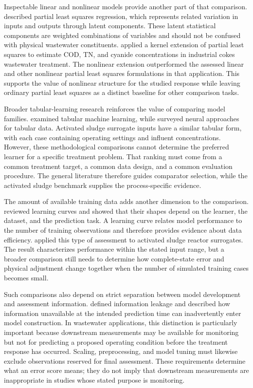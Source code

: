 Inspectable linear and nonlinear models provide another part of that comparison. \citet{Wold2001} described partial least squares regression, which represents related variation in inputs and outputs through latent components. These latent statistical components are weighted combinations of variables and should not be confused with physical wastewater constituents. \citet{Woo2009} applied a kernel extension of partial least squares to estimate COD, TN, and cyanide concentrations in industrial cokes wastewater treatment. The nonlinear extension outperformed the assessed linear and other nonlinear partial least squares formulations in that application. This supports the value of nonlinear structure for the studied response while leaving ordinary partial least squares as a distinct baseline for other comparison tasks.

Broader tabular-learning research reinforces the value of comparing model families. \citet{ShwartzZiv2022} examined tabular machine learning, while \citet{Borisov2024} surveyed neural approaches for tabular data. Activated sludge surrogate inputs have a similar tabular form, with each case containing operating settings and influent concentrations. However, these methodological comparisons cannot determine the preferred learner for a specific treatment problem. That ranking must come from a common treatment target, a common data design, and a common evaluation procedure. The general literature therefore guides comparator selection, while the activated sludge benchmark supplies the process-specific evidence.

The amount of available training data adds another dimension to the comparison. \citet{VieringLoog2023} reviewed learning curves and showed that their shapes depend on the learner, the dataset, and the prediction task. A learning curve relates model performance to the number of training observations and therefore provides evidence about data efficiency. \citet{Selerio2026} applied this type of assessment to activated sludge reactor surrogates. The result characterizes performance within the stated input range, but a broader comparison still needs to determine how complete-state error and physical adjustment change together when the number of simulated training cases becomes small.

Such comparisons also depend on strict separation between model development and assessment information. \citet{Kaufman2012} defined information leakage and described how information unavailable at the intended prediction time can inadvertently enter model construction. In wastewater applications, this distinction is particularly important because downstream measurements may be available for monitoring but not for predicting a proposed operating condition before the treatment response has occurred. Scaling, preprocessing, and model tuning must likewise exclude observations reserved for final assessment. These requirements determine what an error score means; they do not imply that downstream measurements are inappropriate in studies whose stated purpose is monitoring.

